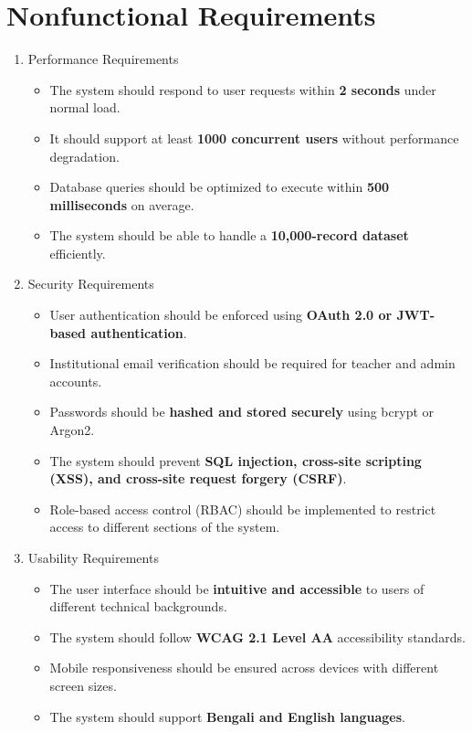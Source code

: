 \section{Nonfunctional Requirements}
\begin{enumerate}
    \item Performance Requirements
    \begin{itemize}
        \item The system should respond to user requests within \textbf{2 seconds} under normal load.
        \item It should support at least \textbf{1000 concurrent users} without performance degradation.
        \item Database queries should be optimized to execute within \textbf{500 milliseconds} on average.
        \item The system should be able to handle a \textbf{10,000-record dataset} efficiently.
    \end{itemize}

    \item Security Requirements
    \begin{itemize}
        \item User authentication should be enforced using \textbf{OAuth 2.0 or JWT-based authentication}.
        \item Institutional email verification should be required for teacher and admin accounts.
        \item Passwords should be \textbf{hashed and stored securely} using bcrypt or Argon2.
        \item The system should prevent \textbf{SQL injection, cross-site scripting (XSS), and cross-site request forgery (CSRF)}.
        \item Role-based access control (RBAC) should be implemented to restrict access to different sections of the system.
    \end{itemize}

    \item Usability Requirements
    \begin{itemize}
        \item The user interface should be \textbf{intuitive and accessible} to users of different technical backgrounds.
        \item The system should follow \textbf{WCAG 2.1 Level AA} accessibility standards.
        \item Mobile responsiveness should be ensured across devices with different screen sizes.
        \item The system should support \textbf{Bengali and English languages}.
    \end{itemize}


\end{enumerate}
